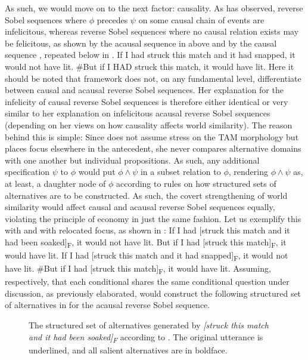 As such, we would move on to the next factor: causality. As \textcite{Klecha2014} has observed, reverse Sobel sequences where $\phi$ precedes $\psi$ on some causal chain of events are infelicitous, whereas reverse Sobel sequences where no causal relation exists may be felicitous, as shown by the acausal sequence in  above and by the causal sequence , repeated below in . 
\ex{}If I had struck this match and it had snapped, it would not have lit. \#But if I \MakeUppercase{had} struck this match, it would have lit.
\xe
Here it should be noted that  framework does not, on any fundamental level, differentiate between causal and acausal reverse Sobel sequences. Her explanation for the infelicity of causal reverse Sobel sequences is therefore either identical or very similar to her explanation on infelicitous acausal reverse Sobel sequences (depending on her views on how causality affects world similarity). The reason behind this is simple: Since \textcite{Ippolito2020} does not assume stress on the TAM morphology but places focus elsewhere in the antecedent, she never compares alternative domains with one another but individual propositions. As such, any additional specification $\psi$ to $\phi$ would put $\phi\land\psi$ in a subset relation to $\phi$, rendering $\phi\land\psi$ as, at least, a daughter node of $\phi$ according to  rules on how structured sets of alternatives are to be constructed. As such, the covert strengthening of world similarity would affect causal and acausal reverse Sobel sequences equally, violating the principle of economy in just the same fashion. Let us exemplify this with  and  with relocated focus, as shown in :
\pex\label{ex:relocationfocus}
\a If I had [struck this match and it had been soaked]\textsubscript{F}, it would not have lit. But if I {had} [struck this match]\textsubscript{F}, it would have lit.
\a If I had [struck this match and it had snapped]\textsubscript{F}, it would not have lit. \#But if I had [struck this match]\textsubscript{F}, it would have lit.
\xe
Assuming, respectively, that each conditional shares the same conditional question under discussion, as previously elaborated, \textcite{Ippolito2020} would construct the following structured set of alternatives in  for the acausal reverse Sobel sequence.
\begin{figure}[!htb]
    \centering
    
    \caption{The structured set of alternatives generated by \textit{[struck this match and it had been soaked]\textsubscript{F}} according to \textcite{Ippolito2020}. The original utterance is underlined, and all salient alternatives are in boldface.}
\end{figure}

